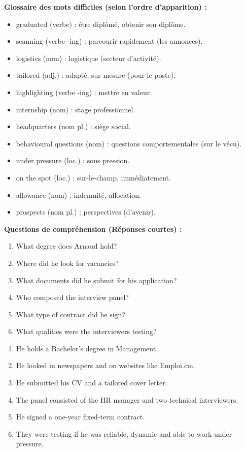 \documentclass[11pt]{article}
\newcommand{\cle}[1]{{\popxbold\color{popdark}#1}}
\begin{document}
\noindent\textbf{Glossaire des mots difficiles (selon l'ordre d'apparition) :}
\begin{itemize}
    \item \cle{graduated} (verbe) : être diplômé, obtenir son diplôme.
    \item \cle{scanning} (verbe -ing) : parcourir rapidement (les annonces).
    \item \cle{logistics} (nom) : logistique (secteur d'activité).
    \item \cle{tailored} (adj.) : adapté, sur mesure (pour le poste).
    \item \cle{highlighting} (verbe -ing) : mettre en valeur.
    \item \cle{internship} (nom) : stage professionnel.
    \item \cle{headquarters} (nom pl.) : siège social.
    \item \cle{behavioural questions} (nom) : questions comportementales (sur le vécu).
    \item \cle{under pressure} (loc.) : sous pression.
    \item \cle{on the spot} (loc.) : sur-le-champ, immédiatement.
    \item \cle{allowance} (nom) : indemnité, allocation.
    \item \cle{prospects} (nom pl.) : perspectives (d'avenir).
\end{itemize}

\noindent\textbf{Questions de compréhension (Réponses courtes) :}
\begin{enumerate}
    \item What degree does Arnaud hold?
    \item Where did he look for vacancies?
    \item What documents did he submit for his application?
    \item Who composed the interview panel?
    \item What type of contract did he sign?
    \item What qualities were the interviewers testing?
\end{enumerate}

\begin{corrige}
\begin{enumerate}
    \item He holds a Bachelor's degree in Management.
    \item He looked in newspapers and on websites like Emploi.cm.
    \item He submitted his CV and a tailored cover letter.
    \item The panel consisted of the HR manager and two technical interviewers.
    \item He signed a one-year fixed-term contract.
    \item They were testing if he was reliable, dynamic and able to work under pressure.
\end{enumerate}
\end{corrige}
\end{document}
